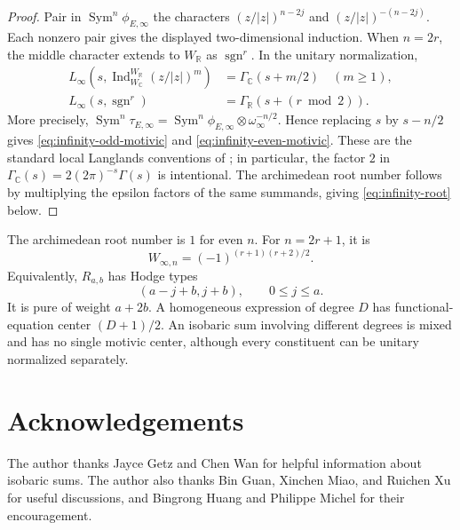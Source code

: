 \documentclass[11pt,reqno]{amsart}
\theoremstyle{definition}
\theoremstyle{remark}
\newcommand{\C}{\mathbb C}
\newcommand{\Sym}{\operatorname{Sym}}
\newcommand{\Ind}{\operatorname{Ind}}
\newcommand{\GammaR}{\Gamma_{\mathbb R}}
\newcommand{\GammaC}{\Gamma_{\mathbb C}}
\begin{document}
\begin{proof}
Pair in $\Sym^n\phi_{E,\infty}$ the characters
$(z/|z|)^{n-2j}$ and $(z/|z|)^{-(n-2j)}$.  Each nonzero pair gives the
displayed two-dimensional induction.  When $n=2r$, the middle character
extends to $W_\mathbb R$ as $\operatorname{sgn}^{r}$.  In the unitary
normalization,
\begin{align*}
 L_\infty\left(s,\Ind_{W_\C}^{W_\mathbb R}(z/|z|)^m\right)
 &=\GammaC(s+m/2)\quad(m\geq1),\\
 L_\infty(s,\operatorname{sgn}^{r})
 &=\GammaR(s+(r\bmod2)).
\end{align*}
More precisely,
$\Sym^n\tau_{E,\infty}=\Sym^n\phi_{E,\infty}
\otimes\omega_\infty^{-n/2}$.  Hence replacing $s$ by $s-n/2$ gives
\eqref{eq:infinity-odd-motivic} and
\eqref{eq:infinity-even-motivic}.  These are the standard local Langlands
conventions of \cite{GetzHahn}; in particular, the factor $2$ in
$\GammaC(s)=2(2\pi)^{-s}\Gamma(s)$ is intentional.  The archimedean root
number follows by multiplying the epsilon factors of the same summands,
giving \eqref{eq:infinity-root} below.
\end{proof}

The archimedean root number is $1$ for even $n$.  For $n=2r+1$, it is
\begin{equation}\label{eq:infinity-root}
 W_{\infty,n}=(-1)^{(r+1)(r+2)/2}.
\end{equation}
Equivalently, $R_{a,b}$ has Hodge types
\begin{equation}\label{eq:Hodge-types}
 (a-j+b,j+b),\qquad 0\leq j\leq a.
\end{equation}
It is pure of weight $a+2b$.  A homogeneous expression of degree $D$ has
functional-equation center $(D+1)/2$.  An isobaric sum involving different
degrees is mixed and has no single motivic center, although every constituent
can be unitary normalized separately.

\section*{Acknowledgements}

The author thanks Jayce Getz and Chen Wan for helpful information about
isobaric sums.  The author also thanks Bin Guan, Xinchen Miao, and Ruichen Xu
for useful discussions, and Bingrong Huang and Philippe Michel for their
encouragement.
\end{document}
